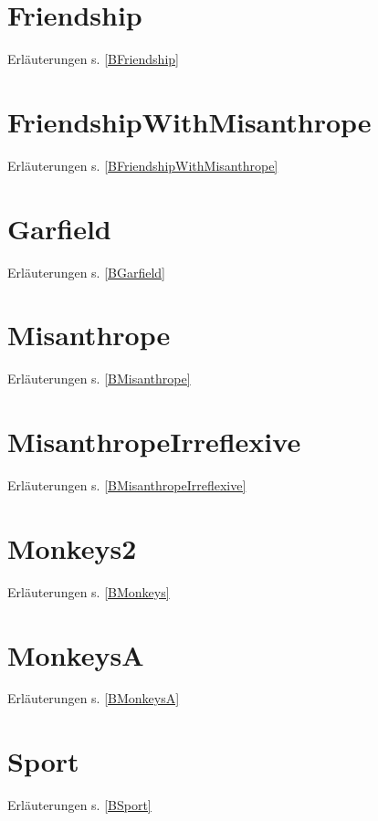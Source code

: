 \documentclass[a4paper, 11pt]{book}
\begin{document}
\newpage


\section{Friendship} Erläuterungen s. \ref{BFriendship}
\label{Friendship}

\newpage

\section{FriendshipWithMisanthrope} Erläuterungen s. \ref{BFriendshipWithMisanthrope}
\label{FriendshipWithMisanthrope}

\newpage

\section{Garfield}  Erläuterungen s. \ref{BGarfield}
\label{Garfield}


\newpage

\section{Misanthrope} Erläuterungen s. \ref{BMisanthrope}
\label{Misanthrope}

\newpage



\section{MisanthropeIrreflexive} Erläuterungen s. \ref{BMisanthropeIrreflexive}
\label{MisanthropeIrreflexive}

\newpage

\section{Monkeys2} Erläuterungen s. \ref{BMonkeys}
\label{Monkeys2}


\newpage

\section{MonkeysA} Erläuterungen s. \ref{BMonkeysA}
\label{MonkeysA}


\newpage

\section{Sport} Erläuterungen s. \ref{BSport}
\label{Sport}

\newpage
\end{document}
